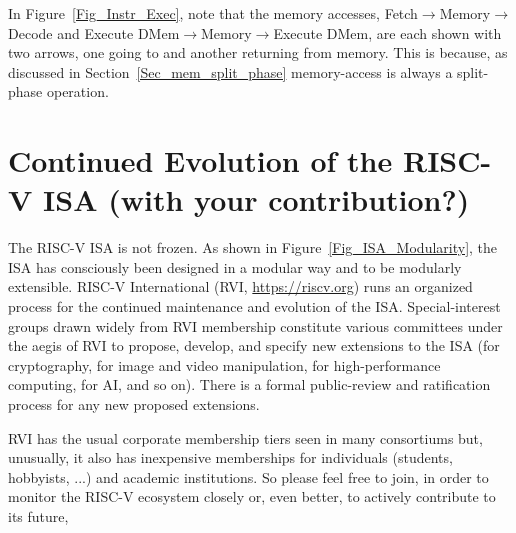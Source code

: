 In Figure~\ref{Fig_Instr_Exec}, note that the memory accesses,
Fetch$\longrightarrow$Memory$\longrightarrow$Decode and Execute
DMem$\longrightarrow$Memory$\longrightarrow$Execute DMem, are each
shown with two arrows, one going to and another returning from memory.
This is because, as discussed in Section~\ref{Sec_mem_split_phase}
memory-access is always a split-phase operation.


\section{Continued Evolution of the RISC-V ISA (with your contribution?)}


The RISC-V ISA is not frozen.  As shown in
Figure~\ref{Fig_ISA_Modularity}, the ISA has consciously been designed
in a modular way and to be modularly extensible.  RISC-V International
(RVI, \url{https://riscv.org}) runs an organized process for the
continued maintenance and evolution of the ISA.  Special-interest
groups drawn widely from RVI membership constitute various committees
under the aegis of RVI to propose, develop, and specify new extensions
to the ISA (for cryptography, for image and video manipulation, for
high-performance computing, for AI, and so on).  There is a formal
public-review and ratification process for any new proposed
extensions.

RVI has the usual corporate membership tiers seen in many consortiums
but, unusually, it also has inexpensive memberships for individuals
(students, hobbyists, ...)  and academic institutions.  So please feel
free to join, in order to monitor the RISC-V ecosystem closely or,
even better, to actively contribute to its future,


